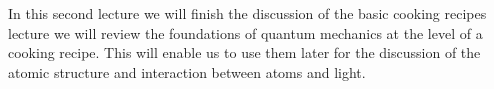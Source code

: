 In this second lecture we will finish the discussion of the basic cooking recipes  lecture we will review the foundations of quantum mechanics at the level of a cooking recipe. This will enable us to use them later for the discussion of the atomic structure and interaction between atoms and light.